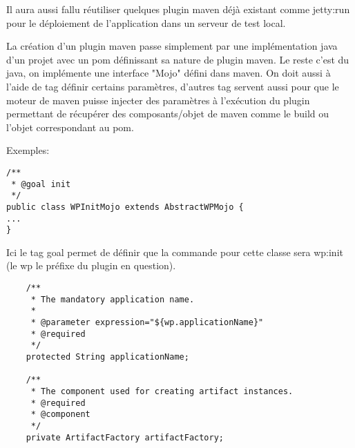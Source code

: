 Il aura aussi fallu réutiliser quelques plugin maven déjà existant comme jetty:run
pour le déploiement de l'application dans un serveur de test local. 

La création d'un plugin maven passe simplement par une implémentation java d'un
projet avec un pom définissant sa nature de plugin maven. Le reste c'est du java,
on implémente une interface "Mojo" défini dans maven. On doit aussi à l'aide de 
tag définir certains paramètres, d'autres tag servent aussi pour que le moteur
de maven puisse injecter des paramètres à l'exécution du plugin permettant de
récupérer des composants/objet de maven comme le build ou l'objet correspondant
au pom.


Exemples:

\begin{lstlisting}
/**
 * @goal init
 */
public class WPInitMojo extends AbstractWPMojo {
...
}
\end{lstlisting}

Ici le tag goal permet de définir que la commande pour cette classe sera wp:init
(le wp le préfixe du plugin en question). 

\begin{lstlisting}
    /**
     * The mandatory application name.
     *
     * @parameter expression="${wp.applicationName}"
     * @required
     */
    protected String applicationName;

    /**
     * The component used for creating artifact instances.
     * @required
     * @component
     */
    private ArtifactFactory artifactFactory;

\end{lstlisting}

